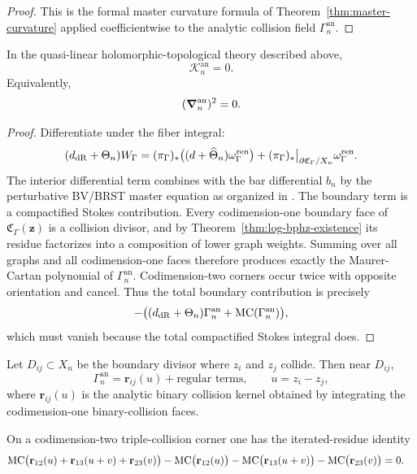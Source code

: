 \begin{proof}
This is the formal master curvature formula of Theorem~\ref{thm:master-curvature} applied coefficientwise to the analytic collision field $\Gamma_n^{\mathrm{an}}$.
\end{proof}

\begin{theorem}%
In the quasi-linear holomorphic-topological theory described above,
\[
 \mathcal K_n^{\mathrm{an}}=0.
\]
Equivalently,
\[
 (\boldsymbol{\nabla}_n^{\mathrm{an}})^2=0.
\]
\end{theorem}

\begin{proof}
Differentiate under the fiber integral:
\[
 (d_{\mathrm{dR}}+\Theta_n)W_\Gamma
 =
 (\pi_\Gamma)_*\big((d+\widehat\Theta_n)\omega_\Gamma^{\mathrm{ren}}\big)
 +
 (\pi_\Gamma)_*\big|_{\partial\mathfrak C_\Gamma/X_n}\omega_\Gamma^{\mathrm{ren}}.
\]
The interior differential term combines with the bar differential $b_n$ by the perturbative BV/BRST master equation as organized in \cite{GKW25}. The boundary term is a compactified Stokes contribution. Every codimension-one boundary face of $\mathfrak C_\Gamma(\mathbf z)$ is a collision divisor, and by Theorem~\ref{thm:log-bphz-existence} its residue factorizes into a composition of lower graph weights. Summing over all graphs and all codimension-one faces therefore produces exactly the Maurer-Cartan polynomial of $\Gamma_n^{\mathrm{an}}$. Codimension-two corners occur twice with opposite orientation and cancel. Thus the total boundary contribution is precisely
\[
 -\big((d_{\mathrm{dR}}+\Theta_n)\Gamma_n^{\mathrm{an}}+\mathrm{MC}(\Gamma_n^{\mathrm{an}})\big),
\]
which must vanish because the total compactified Stokes integral does.
\end{proof}

\begin{theorem}%
Let $D_{ij}\subset X_n$ be the boundary divisor where $z_i$ and $z_j$ collide. Then near $D_{ij}$,
\[
 \Gamma_n^{\mathrm{an}} = \mathbf r_{ij}(u)+\text{regular terms},
 \qquad u=z_i-z_j,
\]
where $\mathbf r_{ij}(u)$ is the analytic binary collision kernel obtained by integrating the codimension-one binary-collision faces.

On a codimension-two triple-collision corner one has the iterated-residue identity
\begin{align*}
 &\mathrm{MC}\big(\mathbf r_{12}(u)+\mathbf r_{13}(u+v)+\mathbf r_{23}(v)\big)
 -\mathrm{MC}\big(\mathbf r_{12}(u)\big)
 -\mathrm{MC}\big(\mathbf r_{13}(u+v)\big)
 -\mathrm{MC}\big(\mathbf r_{23}(v)\big)
 =0.
\end{align*}
\end{theorem}

